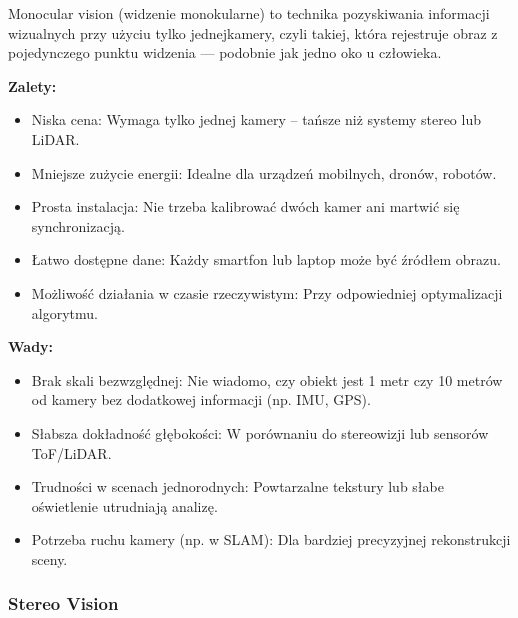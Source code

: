 \documentclass[magisterska]{pracadypl}
\begin{document}
Monocular vision (widzenie monokularne) to technika pozyskiwania informacji wizualnych przy użyciu tylko jednejkamery, czyli takiej, która rejestruje obraz z pojedynczego punktu widzenia — podobnie jak jedno oko u człowieka.\\

\begin{minipage}[t]{0.45\textwidth}
\textbf{Zalety:}
\begin{itemize}
  \item Niska cena: Wymaga tylko jednej kamery – tańsze niż systemy stereo lub LiDAR.

  \item Mniejsze zużycie energii: Idealne dla urządzeń mobilnych, dronów, robotów.

  \item Prosta instalacja: Nie trzeba kalibrować dwóch kamer ani martwić się synchronizacją.

  \item Łatwo dostępne dane: Każdy smartfon lub laptop może być źródłem obrazu.

  \item Możliwość działania w czasie rzeczywistym: Przy odpowiedniej optymalizacji algorytmu.
\end{itemize}
\end{minipage}
\hfill
\begin{minipage}[t]{0.45\textwidth}
\textbf{Wady:}
\begin{itemize}
  \item Brak skali bezwzględnej: Nie wiadomo, czy obiekt jest 1 metr czy 10 metrów od kamery bez dodatkowej informacji (np. IMU, GPS).

  \item Słabsza dokładność głębokości: W porównaniu do stereowizji lub sensorów ToF/LiDAR.

  \item Trudności w scenach jednorodnych: Powtarzalne tekstury lub słabe oświetlenie utrudniają analizę.

  \item Potrzeba ruchu kamery (np. w SLAM): Dla bardziej precyzyjnej rekonstrukcji sceny.
\end{itemize}
\end{minipage}

\subsubsection{Stereo Vision}
\end{document}
